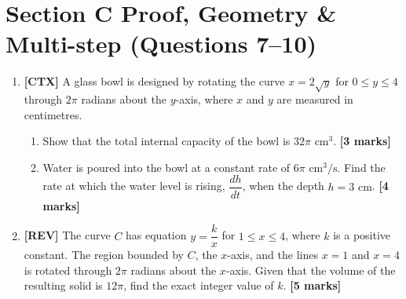 \documentclass[11pt,a4paper]{article}
\begin{document}
\begin{enumerate}[resume]
\end{enumerate}

\section*{Section C \quad Proof, Geometry \& Multi-step \hfill{\normalfont\footnotesize(Questions 7--10)}}
\begin{enumerate}[resume]

\item \textbf{[CTX]} A glass bowl is designed by rotating the curve $x = 2\sqrt{y}$ for $0 \le y \le 4$ through $2\pi$ radians about the $y$-axis, where $x$ and $y$ are measured in centimetres.
\begin{center}
\end{center}
\begin{enumerate}[label=(\alph*)]
  \item Show that the total internal capacity of the bowl is $32\pi \text{ cm}^3$. \hfill{\textbf{[3 marks]}}
  \item Water is poured into the bowl at a constant rate of $6\pi \text{ cm}^3/\text{s}$. Find the rate at which the water level is rising, $\dfrac{dh}{dt}$, when the depth $h = 3 \text{ cm}$. \hfill{\textbf{[4 marks]}}
\end{enumerate}

\item \textbf{[REV]} The curve $C$ has equation $y = \dfrac{k}{x}$ for $1 \le x \le 4$, where $k$ is a positive constant.
The region bounded by $C$, the $x$-axis, and the lines $x = 1$ and $x = 4$ is rotated through $2\pi$ radians about the $x$-axis.
Given that the volume of the resulting solid is $12\pi$, find the exact integer value of $k$. \hfill{\textbf{[5 marks]}}


\end{enumerate}
\end{document}
